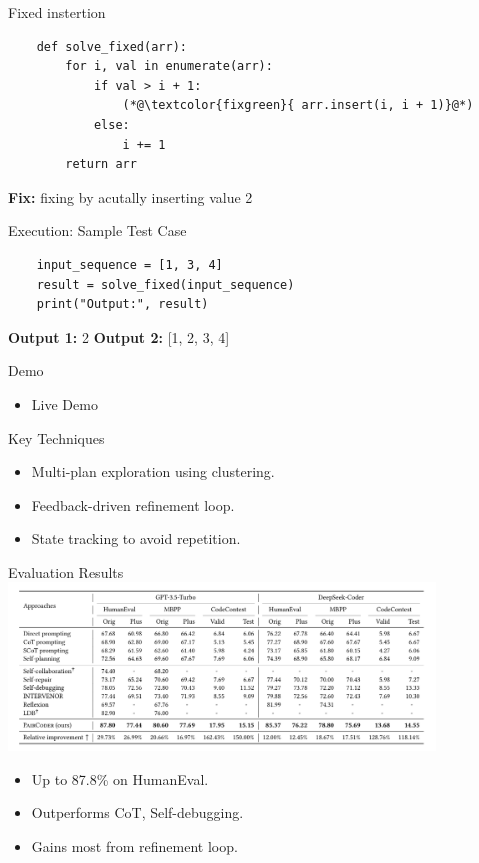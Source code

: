 \documentclass{beamer}
\begin{document}
	\begin{frame}[fragile]{\textcolor{fixgreen}{Fixed instertion}}
	\begin{lstlisting}
	def solve_fixed(arr):
	    for i, val in enumerate(arr):
	        if val > i + 1:
	        	(*@\textcolor{fixgreen}{ arr.insert(i, i + 1)}@*)
	        else:
	            i += 1
	    return arr
	\end{lstlisting}
	\vspace{1em}
	\textbf{Fix:} fixing by acutally inserting value 2
	\end{frame}

	\begin{frame}[fragile]{Execution: Sample Test Case}
	\begin{lstlisting}
	input_sequence = [1, 3, 4]
	result = solve_fixed(input_sequence)
	print("Output:", result)
	\end{lstlisting}
	\vspace{1em}
	\textbf{Output 1:}  2
	\break
	\textbf{Output 2:}  [1, 2, 3, 4]
	\end{frame}

	\begin{frame}{Demo}
	  \begin{itemize}
	    \item Live Demo
	  \end{itemize}
	\end{frame}



	\begin{frame}{Key Techniques}
	  \begin{itemize}
	    \item Multi-plan exploration using clustering.
	    \item Feedback-driven refinement loop.
	    \item State tracking to avoid repetition.
	  \end{itemize}
	\end{frame}
	
	\begin{frame}{Evaluation Results}
	  \includegraphics[width=0.85\textwidth]{paircoder-results.png}
	  \begin{itemize}
	    \item Up to 87.8\% on HumanEval.
	    \item Outperforms CoT, Self-debugging.
	    \item Gains most from refinement loop.
	  \end{itemize}
	\end{frame}
	
\end{document}
